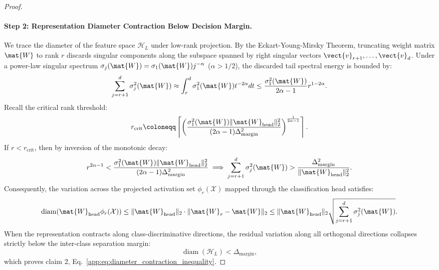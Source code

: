 \begin{proof}
\paragraph{Step 2: Representation Diameter Contraction Below Decision Margin.}
We trace the diameter of the feature space $\mathcal{H}_L$ under low-rank projection.
By the Eckart-Young-Mirsky Theorem, truncating weight matrix $\mat{W}$ to rank $r$ discards singular components along the subspace spanned by right singular vectors $\vect{v}_{r+1}, \dots, \vect{v}_d$.
Under a power-law singular spectrum $\sigma_j(\mat{W}) = \sigma_1(\mat{W}) j^{-\alpha}$ ($\alpha > 1/2$), the discarded tail spectral energy is bounded by:
\begin{equation}
\sum_{j=r+1}^d \sigma_j^2(\mat{W}) \approx \int_r^d \sigma_1^2(\mat{W}) t^{-2\alpha} dt \le \frac{\sigma_1^2(\mat{W})}{2\alpha - 1} r^{1 - 2\alpha}.
\end{equation}
Recall the critical rank threshold:
\begin{equation}
r_{\text{crit}} \coloneqq \left\lceil \left( \frac{\sigma_1^2(\mat{W}) \|\mat{W}_{\text{head}}\|_2^2}{(2\alpha - 1) \Delta_{\text{margin}}^2} \right)^{\frac{1}{2\alpha - 1}} \right\rceil.
\end{equation}
If $r < r_{\text{crit}}$, then by inversion of the monotonic decay:
\begin{equation}
r^{2\alpha - 1} < \frac{\sigma_1^2(\mat{W}) \|\mat{W}_{\text{head}}\|_2^2}{(2\alpha - 1) \Delta_{\text{margin}}^2} \implies \sum_{j=r+1}^d \sigma_j^2(\mat{W}) > \frac{\Delta_{\text{margin}}^2}{\|\mat{W}_{\text{head}}\|_2^2}.
\end{equation}
Consequently, the variation across the projected activation set $\phi_r(\mathcal{X})$ mapped through the classification head satisfies:
\begin{equation}
\operatorname{diam}(\mat{W}_{\text{head}} \phi_r(\mathcal{X})) \le \|\mat{W}_{\text{head}}\|_2 \cdot \|\mat{W}_r - \mat{W}\|_2 \le \|\mat{W}_{\text{head}}\|_2 \sqrt{\sum_{j=r+1}^d \sigma_j^2(\mat{W})}.
\end{equation}
When the representation contracts along class-discriminative directions, the residual variation along all orthogonal directions collapses strictly below the inter-class separation margin:
\begin{equation}
\operatorname{diam}(\mathcal{H}_L) < \Delta_{\text{margin}},
\end{equation}
which proves claim 2, Eq.~\eqref{app:eq:diameter_contraction_inequality}.


\end{proof}

